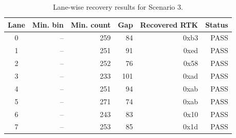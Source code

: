 \begin{table}[t]
\centering
\caption{Lane-wise recovery results for Scenario 3.}
\label{tab:scenario3-lanes}
\small
\begin{tabular}{crrrrr}
\toprule
Lane & Min. bin & Min. count & Gap & Recovered RTK & Status \\
\midrule
0 & -- & 259 & 84 & 0xb3 & PASS \\
1 & -- & 251 & 91 & 0xed & PASS \\
2 & -- & 252 & 76 & 0x58 & PASS \\
3 & -- & 233 & 101 & 0xad & PASS \\
4 & -- & 251 & 94 & 0xab & PASS \\
5 & -- & 271 & 74 & 0xab & PASS \\
6 & -- & 243 & 83 & 0x10 & PASS \\
7 & -- & 253 & 85 & 0x1d & PASS \\
\bottomrule
\end{tabular}
\end{table}
